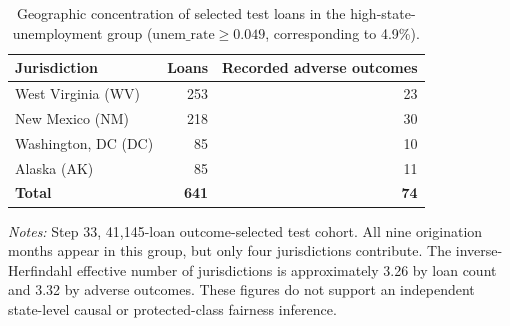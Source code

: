 \documentclass[10pt]{article}
\begin{document}
\begin{table}[!ht]
\centering
\caption{Geographic concentration of selected test loans in the high-state-unemployment group ($\mathrm{unem\_rate}\geq0.049$, corresponding to 4.9\%).}
\label{tab:supp_geographic}
\begin{tabular}{lrr}
\toprule
Jurisdiction & Loans & Recorded adverse outcomes \\
\midrule
West Virginia (WV) & 253 & 23 \\
New Mexico (NM) & 218 & 30 \\
Washington, DC (DC) & 85 & 10 \\
Alaska (AK) & 85 & 11 \\
\midrule
\textbf{Total} & \textbf{641} & \textbf{74} \\
\bottomrule
\end{tabular}
\par\vspace{2pt}
{\footnotesize \textit{Notes:} Step 33, 41,145-loan outcome-selected test cohort. All nine origination months appear in this group, but only four jurisdictions contribute. The inverse-Herfindahl effective number of jurisdictions is approximately 3.26 by loan count and 3.32 by adverse outcomes. These figures do not support an independent state-level causal or protected-class fairness inference.}
\end{table}
\end{document}

